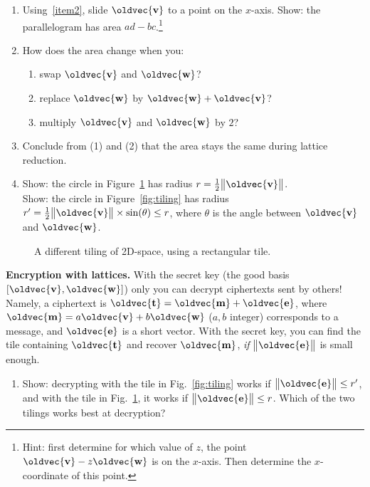 \documentclass[10pt,a4paper]{article}
\renewcommand{\vec}[1]{\oldvec{\mathbf{#1}}}
\DeclarePairedDelimiter{\norm}{\big\lVert}{\big\rVert}
\begin{document}
\begin{enumerate}[resume*]
	\item Using~\ref{item2}, slide \(\vec{v}\) to a point on the \(x\)-axis.
		Show: the parallelogram has area \(ad - bc\).\footnote{Hint: first determine for which value of \(z\), the point \(\vec{v} - z \vec{w}\) is on the \(x\)-axis. Then determine the \(x\)-coordinate of this point.}

	\item How does the area change when you:
		\begin{enumerate}
		\item swap \(\vec{v}\) and \(\vec{w}\)?
		\item replace \(\vec{w}\) by \(\vec{w} + \vec{v}\)?
		\item multiply \(\vec{v}\) and \(\vec{w}\) by \(2\)?
		\end{enumerate}
	\item Conclude from (1) and (2) that the area stays the same during lattice reduction.

	\item
		Show: the circle in Figure~\ref{fig:tiling-np} has radius \(r = \frac12 \norm{\vec{v}}\). \\
		Show: the circle in Figure~\ref{fig:tiling} has radius \(r' = \frac12 \norm{\vec{v}} \times \sin(\theta) \leq r\), where \(\theta\) is the angle between \(\vec{v}\) and \(\vec{w}\). \\
\end{enumerate}
\begin{figure}[h!]
	\centering{}
	\caption{A different tiling of 2D-space, using a rectangular tile.}\label{fig:tiling-np}
\end{figure}
\noindent
\textbf{Encryption with lattices.}
With the secret key (the good basis \([\vec{v},\vec{w}]\)) only you can decrypt ciphertexts sent by others!
Namely, a ciphertext is \(\vec{t} = \vec{m} + \vec{e}\),
	where \(\vec{m} = a \vec{v} + b \vec{w}\) (\(a, b\) integer) corresponds to a message,
	and \(\vec{e}\) is a short vector.
With the secret key, you can find the tile containing \(\vec{t}\) and recover \(\vec{m}\), \emph{if} \(\norm{\vec{e}}\) is small enough.

\begin{enumerate}[resume*]
	\item Show: decrypting with the tile in Fig.~\ref{fig:tiling}
	works if \(\norm{\vec{e}} \leq r'\),
	and with the tile in Fig.~\ref{fig:tiling-np}, it works if \(\norm{\vec{e}} \leq r\).
	Which of the two tilings works best at decryption?
\end{enumerate}
\end{document}
